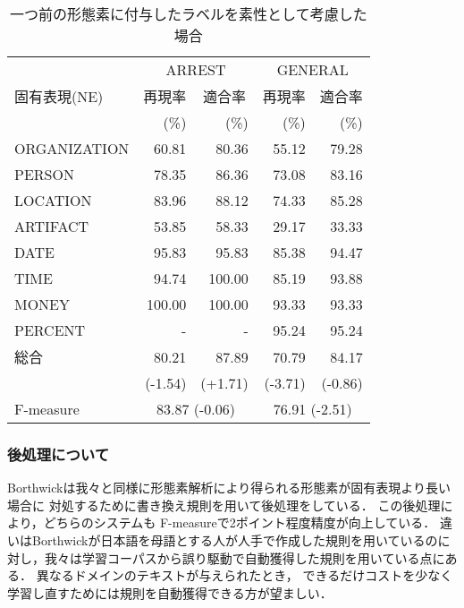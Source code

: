 {\scriptsize
\begin{table*}[htbp]
  \begin{center}
    \caption{一つ前の形態素に付与したラベルを素性として考慮した場合}
    \label{Comparison4} 
    \begin{tabular}{|l|r@{ }r|r@{ }r|}
      \hline
      & \multicolumn{2}{c|}{ARREST} 
      & \multicolumn{2}{c|}{GENERAL}\\
      \cline{2-5}
      固有表現(NE) & \multicolumn{1}{c}{再現率} 
      & \multicolumn{1}{c|}{適合率} & \multicolumn{1}{c}{再現率} 
      & \multicolumn{1}{c|}{適合率} \\
      & (\%) & (\%) & (\%) & (\%) \\
      \hline      
      ORGANIZATION &  60.81 &  80.36 & 55.12 &  79.28\\
      PERSON       &  78.35 &  86.36 & 73.08 &  83.16\\
      LOCATION     &  83.96 &  88.12 & 74.33 &  85.28\\
      ARTIFACT     &  53.85 &  58.33 & 29.17 &  33.33\\
      DATE         &  95.83 &  95.83 & 85.38 &  94.47\\
      TIME         &  94.74 & 100.00 & 85.19 &  93.88\\
      MONEY        & 100.00 & 100.00 & 93.33 &  93.33\\
      PERCENT      &      - &      - & 95.24 &  95.24\\
      \hline
      総合 & 80.21 & 87.89 & 70.79 & 84.17\\
      & (-1.54) & (+1.71) & (-3.71) & (-0.86) \\
      \hline
      \hline
      F-measure & \multicolumn{2}{c|}{83.87 (-0.06)} 
      & \multicolumn{2}{c|}{76.91 (-2.51)} \\
      \hline
    \end{tabular}
  \end{center}
\end{table*}
}

  
\subsubsection{後処理について}

Borthwickは我々と同様に形態素解析により得られる形態素が固有表現より長い場合に
対処するために書き換え規則を用いて後処理をしている．
この後処理により，どちらのシステムも
F-measureで2ポイント程度精度が向上している．
違いはBorthwickが日本語を母語とする人が人手で作成した規則を用いているのに
対し，我々は学習コーパスから誤り駆動で自動獲得した規則を用いている点にある．
異なるドメインのテキストが与えられたとき，
できるだけコストを少なく学習し直すためには規則を自動獲得できる方が望ましい．

